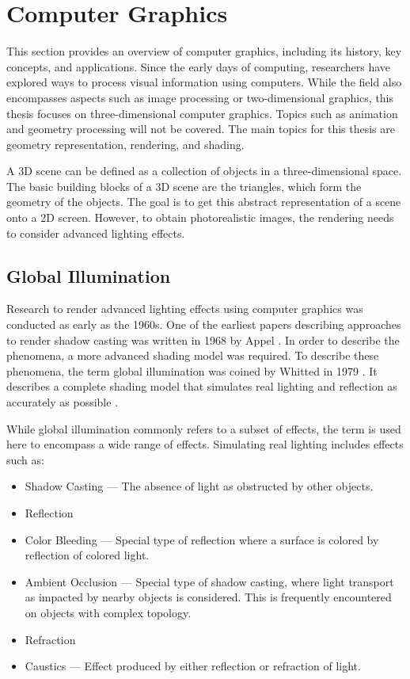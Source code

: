 \section{Computer Graphics}
\label{ch:computerGraphics}

This section provides an overview of computer graphics, including its history, key concepts, and applications. Since the early days of computing, researchers have explored ways to process visual information using computers. While the field also encompasses aspects such as image processing or two-dimensional graphics, this thesis focuses on three-dimensional computer graphics. Topics such as animation and geometry processing will not be covered. The main topics for this thesis are geometry representation, rendering, and shading.

A 3D scene can be defined as a collection of objects in a three-dimensional space. The basic building blocks of a 3D scene are the triangles, which form the geometry of the objects. The goal is to get this abstract representation of a scene onto a 2D screen. However, to obtain photorealistic images, the rendering needs to consider advanced lighting effects.

\subsection{Global Illumination}

Research to render advanced lighting effects using computer graphics was conducted as early as the 1960s. One of the earliest papers describing approaches to render shadow casting was written in 1968 by Appel \cite{appel1968shading}. In order to describe the phenomena, a more advanced shading model was required. To describe these phenomena, the term global illumination was coined by Whitted in 1979 \cite{whittedGlobalIllumination}. It describes a complete shading model that simulates real lighting and reflection as accurately as possible \cite{whitted2020OriginsOfGlobalIllumination}.

While global illumination commonly refers to a subset of effects, the term is used here to encompass a wide range of effects. Simulating real lighting includes effects such as:

\begin{itemize}
  \item{Shadow Casting} — The absence of light as obstructed by other objects.
  \item{Reflection}
  \item{Color Bleeding} — Special type of reflection where a surface is colored by reflection of colored light.
  \item{Ambient Occlusion} — Special type of shadow casting, where light transport as impacted by nearby objects is considered. This is frequently encountered on objects with complex topology.
  \item{Refraction}
  \item{Caustics} — Effect produced by either reflection or refraction of light.
\end{itemize}

